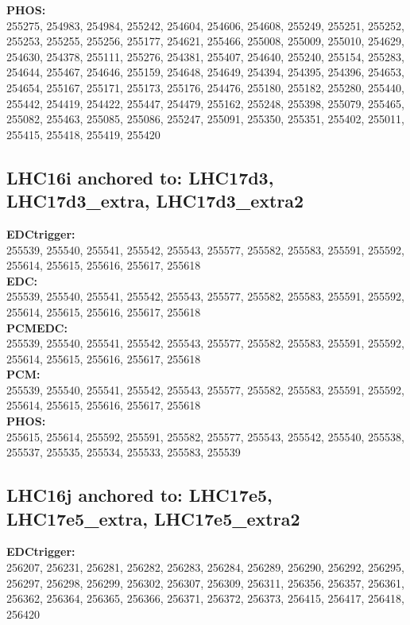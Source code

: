  \textbf{PHOS:}\\
255275, 254983, 254984, 255242, 254604, 254606, 254608, 255249, 255251, 255252, 255253, 255255, 255256, 255177, 254621, 255466, 255008, 255009, 255010, 254629, 254630, 254378, 255111, 255276, 254381, 255407, 254640, 255240, 255154, 255283, 254644, 255467, 254646, 255159, 254648, 254649, 254394, 254395, 254396, 254653, 254654, 255167, 255171, 255173, 255176, 254476, 255180, 255182, 255280, 255440, 255442, 254419, 254422, 255447, 254479, 255162, 255248, 255398, 255079, 255465, 255082, 255463, 255085, 255086, 255247, 255091, 255350, 255351, 255402, 255011, 255415, 255418, 255419, 255420\\

 \subsection{LHC16i anchored to: LHC17d3, LHC17d3\_extra, LHC17d3\_extra2}

 \textbf{EDCtrigger:}\\
255539, 255540, 255541, 255542, 255543, 255577, 255582, 255583, 255591, 255592, 255614, 255615, 255616, 255617, 255618\\

 \textbf{EDC:}\\
255539, 255540, 255541, 255542, 255543, 255577, 255582, 255583, 255591, 255592, 255614, 255615, 255616, 255617, 255618\\

 \textbf{PCMEDC:}\\
255539, 255540, 255541, 255542, 255543, 255577, 255582, 255583, 255591, 255592, 255614, 255615, 255616, 255617, 255618\\

 \textbf{PCM:}\\
255539, 255540, 255541, 255542, 255543, 255577, 255582, 255583, 255591, 255592, 255614, 255615, 255616, 255617, 255618\\

 \textbf{PHOS:}\\
255615, 255614, 255592, 255591, 255582, 255577, 255543, 255542, 255540, 255538, 255537, 255535, 255534, 255533, 255583, 255539\\

 \subsection{LHC16j anchored to: LHC17e5, LHC17e5\_extra, LHC17e5\_extra2}

 \textbf{EDCtrigger:}\\
256207, 256231, 256281, 256282, 256283, 256284, 256289, 256290, 256292, 256295, 256297, 256298, 256299, 256302, 256307, 256309, 256311, 256356, 256357, 256361, 256362, 256364, 256365, 256366, 256371, 256372, 256373, 256415, 256417, 256418, 256420\\

